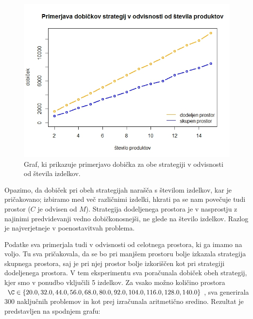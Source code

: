 \documentclass[a4paper]{article}
\begin{document}
\begin{figure}[ht]
\includegraphics [scale = 0.6]{primerjava-strategij-stevilo-produktov}
\caption{Graf, ki prikazuje primerjavo dobička za obe strategiji v odvisnosti od števila izdelkov.}
\end{figure}

Opazimo, da dobiček pri obeh strategijah narašča s številom izdelkov, kar je pričakovano; izbiramo med več različnimi izdelki, hkrati pa se nam povečuje tudi prostor ($C$ je odvisen od $M$). Strategija dodeljenega prostora je v nasprostju z najinimi predvidevanji vedno dobičkonosnejši, ne glede na število izdelkov. Razlog je najverjetneje v poenostavitvah problema. 

Podatke sva primerjala tudi v odvisnosti od celotnega prostora, ki ga imamo na voljo. Tu sva pričakovala, da se bo pri manjšem prostoru bolje izkazala strategija skupnega prostora, saj je pri njej prostor bolje izkoriščen kot pri strategiji dodeljenega prostora. V tem eksperimentu sva poračunala dobiček obeh strategij, kjer smo v ponudbo vključili 5 izdelkov. Za vsako možno količino prostora $\C \in \{20.0, 32.0, 44.0, 56.0, 68.0, 80.0, 92.0, 104.0, 116.0, 128.0, 140.0\}$, sva generirala 300 naključnih problemov in kot prej izračunala aritmetično sredino. Rezultat je predstavljen na spodnjem grafu:
\end{document}
